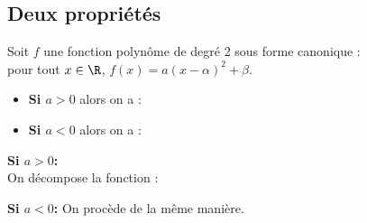\documentclass[a4paper,11pt,cours]{nsi}
\begin{document}
\subsection{Deux propriétés}
\begin{propriete}[\ 1]
	Soit $f$ une fonction polynôme de degré 2 sous forme canonique :\\ pour tout $x\in\R$, $f(x)=a(x-\alpha)^2+\beta$.\\
	\begin{itemize}
		\item 	\textbf{Si {\boldmath $a>0$}} alors on a :\\
		\begin{center}
		\end{center}
		\item 	\textbf{Si {\boldmath $a<0$}} alors on a :\\
		\begin{center}
		\end{center}
	\end{itemize}	
\end{propriete}

\newpage

\begin{demonstration}
	\textbf{\boldmath Si $a>0$: }\\
	On décompose la fonction :
	\begin{center}
	
	
	\end{center}
	\textbf{\boldmath Si $a<0$: } On procède de la même manière.		\end{demonstration}
\end{document}
